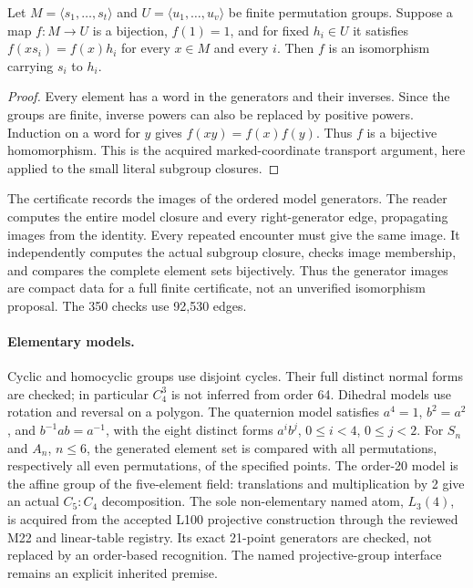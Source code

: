 \documentclass[11pt]{article}
\begin{document}
\begin{lemma}
Let $M=\langle s_1,\ldots,s_t\rangle$ and $U=\langle u_1,\ldots,u_v\rangle$
be finite permutation groups. Suppose a map $f:M\longrightarrow U$ is a
bijection, $f(1)=1$, and for fixed $h_i\in U$ it satisfies
$f(xs_i)=f(x)h_i$ for every $x\in M$ and every $i$. Then $f$ is an
isomorphism carrying $s_i$ to $h_i$.
\end{lemma}
\begin{proof}
Every element has a word in the generators and their inverses. Since the
groups are finite, inverse powers can also be replaced by positive powers.
Induction on a word for $y$ gives $f(xy)=f(x)f(y)$. Thus $f$ is a bijective
homomorphism. This is the acquired marked-coordinate transport argument,
here applied to the small literal subgroup closures.
\end{proof}

The certificate records the images of the ordered model generators.
The reader computes the entire model closure and every right-generator
edge, propagating images from the identity. Every repeated encounter must
give the same image. It independently computes the actual subgroup closure,
checks image membership, and compares the complete element sets bijectively.
Thus the generator images are compact data for a full finite certificate,
not an unverified isomorphism proposal. The 350 checks use 92,530 edges.

\paragraph{Elementary models.}
Cyclic and homocyclic groups use disjoint cycles. Their full distinct normal
forms are checked; in particular $C_4^3$ is not inferred from order 64.
Dihedral models use rotation and reversal on a polygon. The quaternion
model satisfies $a^4=1$, $b^2=a^2$, and $b^{-1}ab=a^{-1}$, with the eight
distinct forms $a^ib^j$, $0\le i<4$, $0\le j<2$.
For $S_n$ and $A_n$, $n\le6$, the generated element set is compared with
all permutations, respectively all even permutations, of the specified
points. The order-20 model is the affine group of the five-element field:
translations and multiplication by 2 give an actual $C_5:C_4$ decomposition.
The sole non-elementary named atom, $L_3(4)$, is acquired from the accepted
L100 projective construction through the reviewed M22 and linear-table
registry. Its exact 21-point generators are checked, not replaced by an
order-based recognition. The named projective-group interface remains an
explicit inherited premise.
\end{document}
